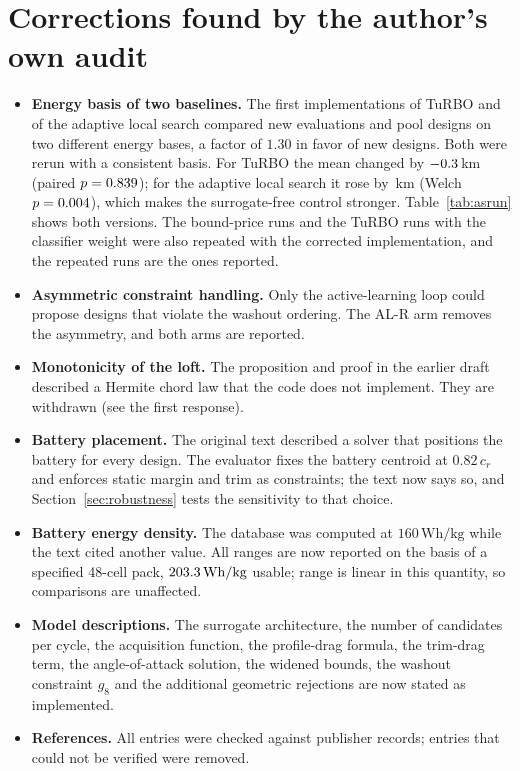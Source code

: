 \documentclass[11pt]{article}
\begin{document}
\section{Corrections found by the author's own audit}
\label{sec:corrections}
\begin{itemize}[leftmargin=1.5em,itemsep=3pt]
  \item \textbf{Energy basis of two baselines.} The first implementations of TuRBO and of the adaptive local search compared new evaluations and pool designs on two different energy bases, a factor of $1.30$ in favor of new designs. Both were rerun with a consistent basis. For TuRBO the mean changed by $-0.3$\,km (paired $p = 0.839$); for the adaptive local search it rose by \NvDAdaptvAdaptOld\,km (Welch $p = 0.004$), which makes the surrogate-free control stronger. Table~\ref{tab:asrun} shows both versions. The bound-price runs and the TuRBO runs with the classifier weight were also repeated with the corrected implementation, and the repeated runs are the ones reported.
  \item \textbf{Asymmetric constraint handling.} Only the active-learning loop could propose designs that violate the washout ordering. The AL-R arm removes the asymmetry, and both arms are reported.
  \item \textbf{Monotonicity of the loft.} The proposition and proof in the earlier draft described a Hermite chord law that the code does not implement. They are withdrawn (see the first response).
  \item \textbf{Battery placement.} The original text described a solver that positions the battery for every design. The evaluator fixes the battery centroid at $0.82\,c_r$ and enforces static margin and trim as constraints; the text now says so, and Section~\ref{sec:robustness} tests the sensitivity to that choice.
  \item \textbf{Battery energy density.} The database was computed at $160\,\mathrm{Wh/kg}$ while the text cited another value. All ranges are now reported on the basis of a specified 48-cell pack, $203.3\,\mathrm{Wh/kg}$ usable; range is linear in this quantity, so comparisons are unaffected.
  \item \textbf{Model descriptions.} The surrogate architecture, the number of candidates per cycle, the acquisition function, the profile-drag formula, the trim-drag term, the angle-of-attack solution, the widened bounds, the washout constraint $g_8$ and the additional geometric rejections are now stated as implemented.
  \item \textbf{References.} All entries were checked against publisher records; entries that could not be verified were removed.
\end{itemize}
\end{document}
